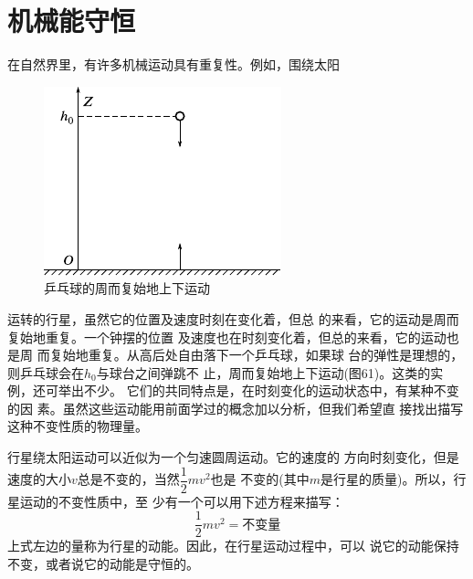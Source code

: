 \section{机械能守恒}\label{sec:06.01}

在自然界里，有许多机械运动具有重复性。例如，围绕太阳
\begin{figure}
  \centering
  \includegraphics{figure/fig06.01}\vspace{1em}
  \caption{乒乓球的周而复始地上下运动}
  \label{fig:06.01}
\end{figure}
运转的行星，虽然它的位置及速度时刻在变化着，但总
的来看，它的运动是周而复始地重复。一个钟摆的位置
及速度也在时刻变化着，但总的来看，它的运动也是周
而复始地重复。从高后处自由落下一个乒乓球，如果球
台的弹性是理想的，则乒乓球会在$ h _ { 0 } $与球台之间弹跳不
止，周而复始地上下运动(图61)。这类的实例，还可举出不少。
它们的共同特点是，在时刻变化的运动状态中，有某种不变的因
素。虽然这些运动能用前面学过的概念加以分析，但我们希望直
接找出描写这种不变性质的物理量。

行星绕太阳运动可以近似为一个匀速圆周运动。它的速度的
方向时刻变化，但是速度的大小$ v $总是不变的，当然$ \dfrac { 1 } { 2 } m v ^ { 2 } $也是
\clearpage\noindent
不变的(其中$ m $是行星的质量)。所以，行星运动的不变性质中，至
少有一个可以用下述方程来描写：
\begin{equation}\label{eqn:06.01.01}
  \frac { 1 } { 2 } m v ^ { 2 } = \text{不变量}
\end{equation}
上式左边的量称为行星的动能。因此，在行星运动过程中，可以
说它的动能保持不变，或者说它的动能是守恒的。


